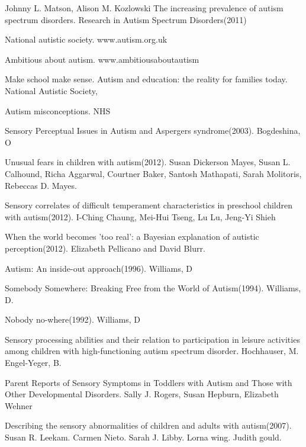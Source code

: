 \documentclass[11pt]{report}
\begin{document}
\begin{thebibliography}{9}

Johnny L. Matson, Alison M. Kozlowski
The increasing prevalence of autism spectrum disorders. Research in Autism Spectrum Disorders(2011)

National autistic society. www.autism.org.uk

Ambitious about autism. www.ambitiousaboutautism

Make school make sense. Autism and education: the reality for families today. National Autistic Society, 

Autism misconceptions. NHS

Sensory Perceptual Issues in Autism and Aspergers syndrome(2003). Bogdeshina, O

Unusual fears in children with autism(2012). Susan Dickerson Mayes, Susan L. Calhound, Richa Aggarwal, Courtner Baker, Santosh Mathapati, Sarah Molitoris, Rebeccas D. Mayes.

Sensory correlates of difficult temperament characteristics in preschool children with autism(2012). I-Ching Chaung, Mei-Hui Tseng, Lu Lu, Jeng-Yi Shieh

When the world becomes 'too real': a Bayesian explanation of autistic perception(2012). Elizabeth Pellicano and David Blurr.

Autism: An inside-out approach(1996). Williams, D

Somebody Somewhere: Breaking Free from the World of Autism(1994). Williams, D.

Nobody no-where(1992). Williams, D

Sensory processing abilities and their relation to participation in leisure activities among children with high-functioning autism spectrum disorder. Hochhauser, M. Engel-Yeger, B.

Parent Reports of Sensory Symptoms in Toddlers with Autism and Those with Other Developmental Disorders. Sally J. Rogers, Susan Hepburn, Elizabeth Wehner

Describing the sensory abnormalities of children and adults with autism(2007). Susan R. Leekam. Carmen Nieto. Sarah J. Libby. Lorna wing. Judith gould. 


\end{thebibliography}
\end{document}
